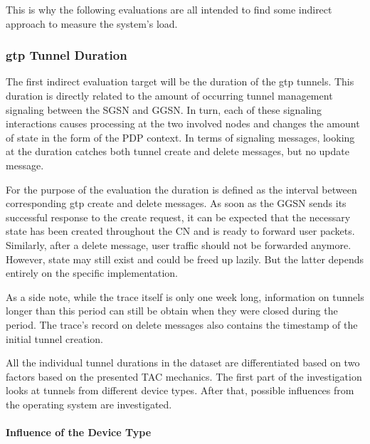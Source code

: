 This is why the following evaluations are all intended to find some indirect approach to measure the system's load.



\subsubsection{\texorpdfstring{\acrshort{gtp}}{GTP} Tunnel Duration}

The first indirect evaluation target will be the duration of the \gls{gtp} tunnels. This duration is directly related to the amount of occurring tunnel management signaling between the \gls{SGSN} and \gls{GGSN}. In turn, each of these signaling interactions causes processing at the two involved nodes and changes the amount of state in the form of the \gls{PDP} context. In terms of signaling messages, looking at the duration catches both tunnel create and delete messages, but no update message.

For the purpose of the evaluation the duration is defined as the interval between corresponding \gls{gtp} create and delete messages. As soon as the \gls{GGSN} sends its successful response to the create request, it can be expected that the necessary state has been created throughout the \gls{CN} and is ready to forward user packets. Similarly, after a delete message, user traffic should not be forwarded anymore. However, state may still exist and could be freed up lazily. But the latter depends entirely on the specific implementation.

As a side note, while the trace itself is only one week long, information on tunnels longer than this period can still be obtain when they were closed during the period. The trace's record on delete messages also contains the timestamp of the initial tunnel creation.

All the individual tunnel durations in the dataset are differentiated based on two factors based on the presented \gls{TAC} mechanics. The first part of the investigation looks at tunnels from different device types. After that, possible influences from the operating system are investigated. 

\paragraph{Influence of the Device Type}


